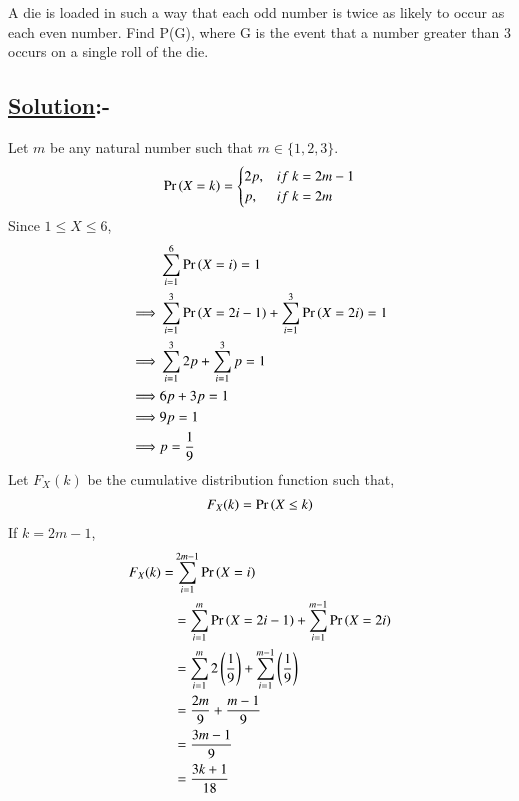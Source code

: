 \documentclass[journal,12pt,twocolumn]{IEEEtran}
\begin{document}
A die is loaded in such a way that each odd number is twice as likely to occur as
each even number. Find P(G), where G is the event that a number greater than
3 occurs on a single roll of the die.

\subsection*{\textbf{\underline{Solution}:-}}

\begin{table}[h]

\end{table}

Let $m$ be any natural number such that $m\in\{1,2,3\}$.\\ 
\begin{align}
\Pr\left(X=k\right)= \begin{cases} 
      2p, & if\ k=2m-1 \\
      p, & if\ k=2m 
   \end{cases}
\end{align}
Since $1\leq X \leq6$,
\begin{align}
&\sum_{i=1}^{6}{\Pr\left(X=i\right)} = 1\\
\implies &\sum_{i=1}^{3}{\Pr\left(X=2i-1\right)} + \sum_{i=1}^{3}{\Pr\left(X=2i\right)} = 1\\
\implies &\sum_{i=1}^{3}{2p} + \sum_{i=1}^{3}{p} = 1\\
\implies &6p+3p = 1\\
\implies &9p = 1\\
\implies &p = \frac{1}{9}
\end{align}
Let $F_X (k)$ be the cumulative distribution function such that,\\
\begin{align}
    F_X (k) = \Pr\left(X\leq k\right)
\end{align}
If $k = 2m-1$,
\begin{align}
    F_X (k) = &\sum_{i=1}^{2m-1}{\Pr\left(X=i\right)}
\\
    &= \sum_{i=1}^{m}{\Pr\left(X=2i-1\right)} + \sum_{i=1}^{m-1}{\Pr\left(X=2i\right)}\\
    &= \sum_{i=1}^{m}{2\left(\frac{1}{9}\right)} + \sum_{i=1}^{m-1}{\left(\frac{1}{9}\right)}\\
    &= \frac{2m}{9} + \frac{m-1}{9}\\
    &= \frac{3m-1}{9}\\
    &= \frac{3k+1}{18}
\end{align}
\end{document}
